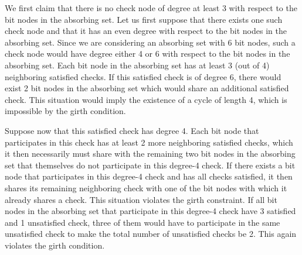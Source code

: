 
We first claim that there is no check node of degree at least 3
with respect to the bit nodes in the absorbing set. Let us first
suppose that there exists one such check node and that it has an
even degree with respect to the bit nodes in the absorbing set.
Since we are considering an absorbing set with 6 bit nodes, such a
check node would have degree either 4 or 6 with respect to the bit
nodes in the absorbing set. Each bit node in the absorbing set has
at least 3 (out of 4) neighboring satisfied checks. If this
satisfied check is of degree 6, there would exist 2 bit nodes in
the absorbing set which would share an additional satisfied check.
This situation would imply the existence of a cycle of length 4,
which is impossible by the girth condition.

Suppose now that this satisfied check has degree 4. Each bit node
that participates in this check has at least 2 more neighboring
satisfied checks, which it then necessarily must share with the
remaining two bit nodes in the absorbing set that themselves do
not participate in this degree-4 check. If there exists a bit node
that participates in this degree-4 check and has all checks
satisfied, it then shares its remaining neighboring check with one
of the bit nodes with which it already shares a check. This
situation violates the girth constraint. If all bit nodes in the
absorbing set that participate in this degree-4 check have 3
satisfied and 1 unsatisfied check, three of them would have to
participate in the same unsatisfied check to make the total number
of unsatisfied checks be 2. This again violates the girth
condition.

